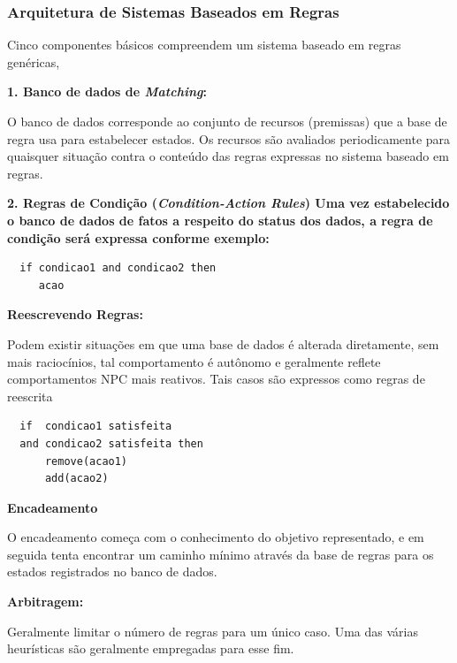 \documentclass[12pt,a4paper,compsoc]{IEEEtran}
\begin{document}
\subsubsection{Arquitetura de Sistemas Baseados em Regras}

  Cinco componentes básicos compreendem um sistema baseado em regras genéricas,

  \textbf{1. Banco de dados de \textit{Matching}:}

  O banco de dados corresponde ao conjunto de recursos (premissas) que a base de regra usa para
  estabelecer estados. Os recursos são avaliados periodicamente para quaisquer situação contra o
  conteúdo das regras expressas no sistema baseado em regras.

  \textbf{2. Regras de Condição (\textit{Condition-Action Rules}) Uma vez estabelecido o banco de
  dados de fatos a respeito do status dos dados, a regra de condição será expressa conforme exemplo:}

  \begin{lstlisting}
  if condicao1 and condicao2 then
     acao
  \end{lstlisting}

  \textbf{Reescrevendo Regras:}

  Podem existir situações em que uma base de dados é alterada diretamente, sem mais raciocínios,
  tal comportamento é autônomo e geralmente reflete comportamentos NPC mais reativos. Tais casos
  são expressos como regras de reescrita 

  \begin{lstlisting}
  if  condicao1 satisfeita
  and condicao2 satisfeita then
      remove(acao1)
      add(acao2)
  \end{lstlisting}

  \textbf{Encadeamento}
  
  O encadeamento  começa com o conhecimento do objetivo  representado, e em seguida tenta encontrar
  um caminho mínimo através da base de regras para os estados registrados no banco de dados.
  
  \textbf{Arbitragem:}
  
  Geralmente limitar o número de regras para um único caso. Uma das várias heurísticas são 
  geralmente empregadas para esse fim.


\end{document}
